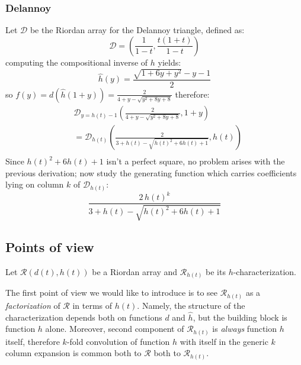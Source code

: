 \subsubsection{Delannoy}

Let $\mathcal{D}$ be the Riordan array for the Delannoy triangle, defined as:
\begin{displaymath} 
    \mathcal{D} =\left( \frac{1}{1-t}, \frac{t(1+t)}{1-t}  \right)
\end{displaymath} 
computing the compositional inverse of $h$ yields:
\begin{displaymath} 
    \hat{h}(y) = \frac{\sqrt{1+6y+y^2}-y-1}{2}
\end{displaymath} 
so $f(y)=d(\hat{h}(1+y))=\frac{2}{4 + y - \sqrt{y^2 + 8y + 8} }$ therefore:
\begin{displaymath} 
    \begin{split}
        & \mathcal{D}_{y=h(t)-1}\left( \frac{2}{4+y-\sqrt{y^2+8y+8}}, 1+y \right)\\
        &= \mathcal{D}_{h(t)}\left( \frac{2}{3+h(t)-\sqrt{h(t)^2+6h(t)+1}}, h(t) \right) \\
    \end{split}
\end{displaymath} 
Since $h(t)^2+6h(t)+1$ isn't a perfect square, no problem arises with the previous
derivation; now study the generating function which carries coefficients lying on column $k$
of $\mathcal{D}_{h(t)}$:
\begin{displaymath} 
    \frac{2\,h(t)^k}{3+h(t)-\sqrt{h(t)^2+6h(t)+1}}
\end{displaymath} 

\subsection{Points of view}

Let $\mathcal{R}\left(d(t),h(t)\right)$ be a Riordan array and $\mathcal{R}_{h(t)}$ be
its $h$-characterization.

The first point of view we would like to introduce is to see 
$\mathcal{R}_{h(t)}$ as a \emph{factorization} 
of $\mathcal{R}$ in terms of $h(t)$. Namely, the structure of the characterization
depends both on functions $d$ and $\hat{h}$, but the building block is function $h$
alone. Moreover, second component of $\mathcal{R}_{h(t)}$ is \emph{always} function $h$ itself,
therefore $k$-fold convolution of function $h$ with itself in the generic
$k$ column expansion is common both to $\mathcal{R}$ both to $\mathcal{R}_{h(t)}$.

